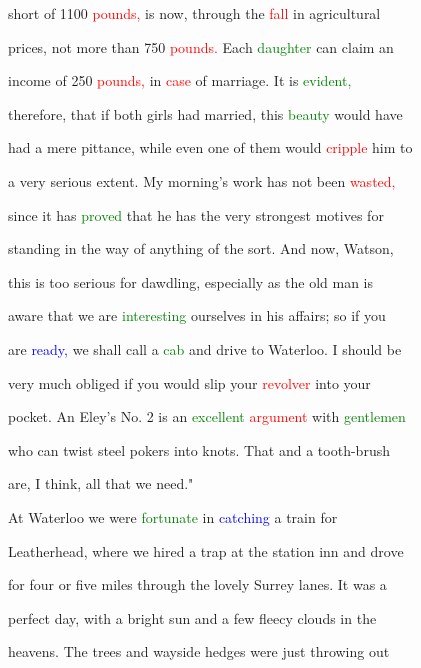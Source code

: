  short of 1100 \textcolor{red}{pounds,} is now, through the \textcolor{red}{fall} in agricultural

 prices, not more than 750 \textcolor{red}{pounds.} Each \textcolor{green}{daughter} can claim an

 \textcolor{BurntOrange}{income} of 250 \textcolor{red}{pounds,} in \textcolor{red}{case} of \textcolor{BurntOrange}{marriage.} It is \textcolor{green}{evident,}

 therefore, that if both girls had married, this \textcolor{green}{beauty} would have

 had a mere pittance, while even one of them would \textcolor{red}{cripple} him to

 a very serious extent. My morning's work has not been \textcolor{red}{wasted,}

 since it has \textcolor{green}{proved} that he has the very strongest motives for

 standing in the way of anything of the sort. And now, Watson,

 this is too serious for dawdling, especially as the old man is

 aware that we are \textcolor{green}{interesting} ourselves in his affairs; so if you

 are \textcolor{blue}{ready,} we shall call a \textcolor{green}{cab} and drive to Waterloo. I should be

 very much \textcolor{BurntOrange}{obliged} if you would \textcolor{BurntOrange}{slip} your \textcolor{red}{revolver} into your

 pocket. An Eley's No. 2 is an \textcolor{green}{excellent} \textcolor{red}{argument} with \textcolor{green}{gentlemen}

 who can twist steel pokers into knots. That and a tooth-brush

 are, I think, all that we need."



 At Waterloo we were \textcolor{green}{fortunate} in \textcolor{blue}{catching} a train for

 Leatherhead, where we \textcolor{BurntOrange}{hired} a trap at the station inn and drove

 for four or five miles through the \textcolor{BurntOrange}{lovely} Surrey lanes. It was a

 \textcolor{BurntOrange}{perfect} day, with a bright \textcolor{BurntOrange}{sun} and a few fleecy clouds in the

 heavens. The \textcolor{BurntOrange}{trees} and wayside hedges were just throwing out

